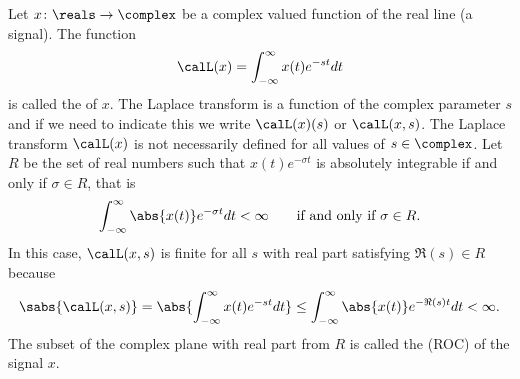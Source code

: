 Let $x \colon \reals \to \complex$ be a complex valued function of the real line (a signal).  The function
\begin{equation}\label{eq:laplace_defn}
\calL(x) = \int_{-\infty}^{\infty} x(t) e^{-st} dt
\end{equation}
is called the  of $x$.  The Laplace transform is a function of the complex parameter $s$ and if we need to indicate this we write $\calL(x)(s)$ or $\calL(x,s)$.  The Laplace transform $\calL(x)$ is not necessarily defined for all values of $s \in \complex$.  
Let $R$ be the set of real numbers such that $x(t) e^{-\sigma t}$ is absolutely integrable if and only if $\sigma \in R$, that is
\[
\int_{-\infty}^{\infty} \abs{x(t)} e^{-\sigma t} dt < \infty  \qquad \text{if and only if $\sigma \in R$}.
\]
In this case, $\calL(x,s)$ is finite for all $s$ with real part satisfying $\Re(s) \in R$ because 
\[
\sabs{\calL(x,s)} = \abs{\int_{-\infty}^{\infty} x(t) e^{-st} dt} \leq \int_{-\infty}^{\infty} \abs{x(t)} e^{-\Re(s) t} dt < \infty.
\]
The subset of the complex plane with real part from $R$ is called the  (ROC) of the signal $x$.  %

